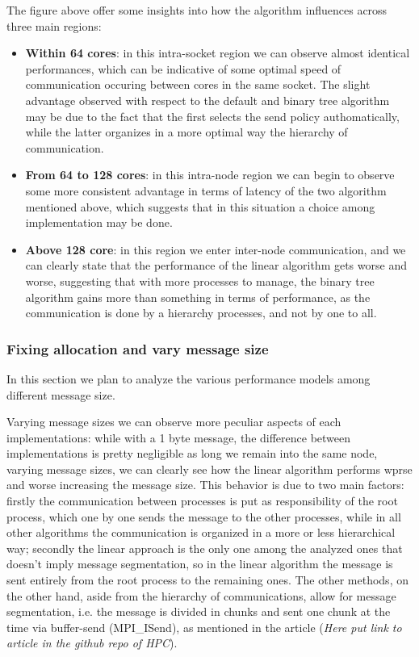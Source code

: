 \documentclass{article}
\begin{document}
	
	The figure above offer some insights into how the algorithm influences across three main regions:
	
	\begin{itemize}
		\item \textbf{Within 64 cores}: in this intra-socket region we can observe almost identical performances, which can be indicative of some optimal speed of communication occuring between cores in the same socket. The slight advantage observed with respect to the default and binary tree algorithm may be due to the fact that the first selects the send policy authomatically, while the latter organizes in a more optimal way the hierarchy of communication.\\
		\item \textbf{From 64 to 128 cores}: in this intra-node region we can begin to observe some more consistent advantage in terms of latency of the two algorithm mentioned above, which suggests that in this situation a choice among implementation may be done.
		\item \textbf{Above 128 core}: in this region we enter inter-node communication, and we can clearly state that the performance of the linear algorithm gets worse and worse, suggesting that with more processes to manage, the binary tree algorithm gains more than something in terms of performance, as the communication is done by a hierarchy processes, and not by one to all.
	\end{itemize}

	\subsubsection{Fixing allocation and vary message size}
	
	In this section we plan to analyze the various performance models among different message size.
	
	
	Varying message sizes we can observe more peculiar aspects of each implementations: while with a 1 byte message, the difference between implementations is pretty negligible as long we remain into the same node, varying message sizes, we can clearly see how the linear algorithm performs wprse and worse increasing the message size.
	This behavior is due to two main factors: firstly the communication between processes is put as responsibility of the root process, which one by one sends the message to the other processes, while in all other algorithms the communication is organized in a more or less hierarchical way; secondly the linear approach is the only one among the analyzed ones that doesn't imply message segmentation, so in the linear algorithm the message is sent entirely from the root process to the remaining ones. The other methods, on the other hand, aside from the hierarchy of communications, allow for message segmentation, i.e. the message is divided in chunks and sent one chunk at the time via buffer-send (MPI\_ISend), as mentioned in the article (\textit{Here put link to article in the github repo of HPC}).
	
\end{document}
